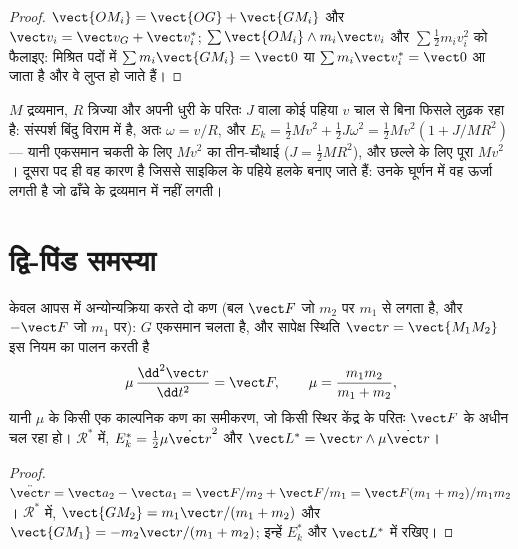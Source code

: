 \begin{proof}
$\vect{OM_i} = \vect{OG} + \vect{GM_i}$ और $\vect v_i = \vect v_G + \vect v_i^*$;
$\sum\vect{OM_i}\wedge m_i\vect v_i$ और $\sum\tfrac12 m_iv_i^2$ को फैलाइए: मिश्रित
पदों में $\sum m_i\vect{GM_i} = \vect 0$ या $\sum m_i\vect v_i^* = \vect 0$
आ जाता है और वे लुप्त हो जाते हैं।
\end{proof}

\begin{example}[लुढ़कता पहिया]\label{ex:b1:systems-of-points:rolling}
$M$ द्रव्यमान, $R$ त्रिज्या और अपनी धुरी के परितः $J$  वाला
कोई पहिया $v$ चाल से बिना फिसले लुढ़क रहा है: संस्पर्श बिंदु विराम में है,
अतः $\omega = v/R$, और $E_k = \tfrac12 Mv^2 + \tfrac12 J\omega^2 = \tfrac12 Mv^2(1 +
J/MR^2)$ --- यानी एकसमान चकती के लिए $Mv^2$ का तीन-चौथाई ($J = \tfrac12 MR^2$),
और छल्ले के लिए पूरा $Mv^2$। दूसरा पद ही वह कारण है जिससे साइकिल के पहिये
हलके बनाए जाते हैं: उनके घूर्णन में वह ऊर्जा लगती है जो ढाँचे के द्रव्यमान
में नहीं लगती।
\end{example}

\section{द्वि-पिंड समस्या}

\begin{proposition}[समानीत द्रव्यमान]\label{prop:b1:systems-of-points:twobody}
केवल आपस में अन्योन्यक्रिया करते दो कण (बल $\vect F$ जो $m_2$ पर $m_1$ से
लगता है, और $-\vect F$ जो $m_1$ पर): $G$ एकसमान चलता है, और सापेक्ष स्थिति
$\vect r = \vect{M_1M_2}$ इस नियम का पालन करती है
\[
\mu\,\frac{\dd^2\vect r}{\dd t^2} = \vect F, \qquad \mu = \frac{m_1m_2}{m_1 + m_2},
\]
यानी \emph{} $\mu$ के किसी एक काल्पनिक कण का समीकरण, जो
किसी स्थिर केंद्र के परितः $\vect F$ के अधीन चल रहा हो। $\mathcal R^*$ में, $E_k^* =
\tfrac12\mu\dot{\vect r}^2$ और $\vect L^* = \vect r\wedge\mu\dot{\vect r}$।
\end{proposition}

\begin{proof}
$\ddot{\vect r} = \vect a_2 - \vect a_1 = \vect F/m_2 + \vect F/m_1 = \vect F(m_1 +
m_2)/m_1m_2$। $\mathcal R^*$ में, $\vect{GM_2} = m_1\vect r/(m_1 + m_2)$ और
$\vect{GM_1} = -m_2\vect r/(m_1 + m_2)$; इन्हें $E_k^*$ और $\vect L^*$ में रखिए।
\end{proof}

